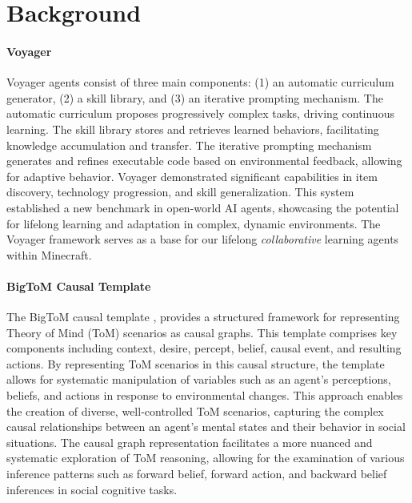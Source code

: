 \documentclass{article}
\begin{document}
\section{Background}\label{sec:bg}

\paragraph{Voyager} Voyager agents consist of three main components: (1) an automatic curriculum generator, (2) a skill library, and (3) an iterative prompting mechanism. The automatic curriculum proposes progressively complex tasks, driving continuous learning. The skill library stores and retrieves learned behaviors, facilitating knowledge accumulation and transfer. The iterative prompting mechanism generates and refines executable code based on environmental feedback, allowing for adaptive behavior. Voyager demonstrated significant capabilities in item discovery, technology progression, and skill generalization. This system established a new benchmark in open-world AI agents, showcasing the potential for lifelong learning and adaptation in complex, dynamic environments.  The Voyager framework serves as a base for our lifelong \textit{collaborative} learning agents within Minecraft. 
 
\paragraph{BigToM Causal Template} 
The BigToM causal template \citep{gandhi2024understanding}, provides a structured framework for representing Theory of Mind (ToM) scenarios as causal graphs. This template comprises key components including context, desire, percept, belief, causal event, and resulting actions. By representing ToM scenarios in this causal structure, the template allows for systematic manipulation of variables such as an agent's perceptions, beliefs, and actions in response to environmental changes. This approach enables the creation of diverse, well-controlled ToM scenarios, capturing the complex causal relationships between an agent's mental states and their behavior in social situations. The causal graph representation facilitates a more nuanced and systematic exploration of ToM reasoning, allowing for the examination of various inference patterns such as forward belief, forward action, and backward belief inferences in social cognitive tasks.
\end{document}

